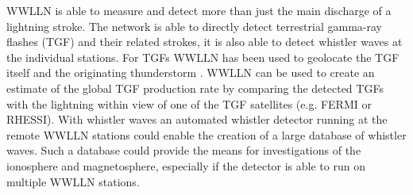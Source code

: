 WWLLN is able to measure and detect more than just the main discharge of a lightning stroke.
The network is able to directly detect terrestrial gamma-ray flashes (TGF) and their related strokes, it is also able to detect whistler waves at the individual stations.
For TGFs WWLLN has been used to geolocate the TGF itself and the originating thunderstorm \citep{Connaughton2010, Connaughton2013}.
WWLLN can be used to create an estimate of the global TGF production rate by comparing the detected TGFs with the lightning within view of one of the TGF satellites (e.g. FERMI or RHESSI).
With whistler waves an automated whistler detector running at the remote WWLLN stations could enable the creation of a large database of whistler waves.
Such a database could provide the means for investigations of the ionosphere and magnetosphere, especially if the detector is able to run on multiple WWLLN stations.






